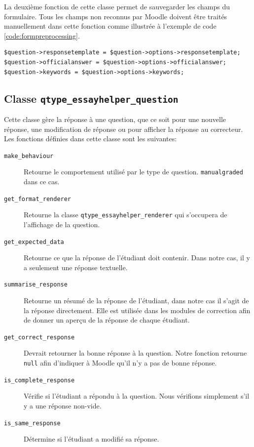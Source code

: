 La deuxi\`eme fonction de cette classe permet de sauvegarder les champs du formulaire.
Tous les champs non reconnus par Moodle doivent \^etre trait\'es manuellement dans cette fonction comme illustr\'ee \`a l'exemple de code \ref{code:formpreprocessing}.
\begin{lstfloat}
\begin{lstlisting}[frame=l]
$question->responsetemplate = $question->options->responsetemplate;
$question->officialanswer = $question->options->officialanswer;
$question->keywords = $question->options->keywords;
\end{lstlisting}
\caption{Extrait du code de la fonction \texttt{data\_preprocessing} de la classe \texttt{qtype\_essayhelper\_edit\_form}.}
\label{code:formpreprocessing}
\end{lstfloat}

\subsection*{Classe \texttt{qtype\_essayhelper\_question}}
Cette classe g\`ere la r\'eponse \`a une question, que ce soit pour une nouvelle r\'eponse, une modification de r\'eponse ou pour afficher la r\'eponse au correcteur.
Les fonctions d\'efinies dans cette classe sont les suivantes:
\begin{description}
  \item[\texttt{make\_behaviour}] Retourne le comportement utilis\'e par le type de question. \texttt{manualgraded} dans ce cas.
  \item[\texttt{get\_format\_renderer}] Retourne la classe \texttt{qtype\_essayhelper\_renderer} qui s'occupera de l'affichage de la question.
  \item[\texttt{get\_expected\_data}] Retourne ce que la r\'eponse de l'\'etudiant doit contenir. Dans notre cas, il y a seulement une r\'eponse textuelle.
  \item[\texttt{summarise\_response}] Retourne un r\'esum\'e de la r\'eponse de l'\'etudiant, dans notre cas il s'agit de la r\'eponse directement. Elle est utilis\'ee dans les modules de correction afin de donner un aper\c{c}u de la r\'eponse de chaque \'etudiant.
  \item[\texttt{get\_correct\_response}] Devrait retourner la bonne r\'eponse \`a la question. Notre fonction retourne \texttt{null} afin d'indiquer \`a Moodle qu'il n'y a pas de bonne r\'eponse.
  \item[\texttt{is\_complete\_response}] V\'erifie si l'\'etudiant a r\'epondu \`a la question. Nous v\'erifions simplement s'il y a une r\'eponse non-vide.
  \item[\texttt{is\_same\_response}] D\'etermine si l'\'etudiant a modifi\'e sa r\'eponse.
\end{description}

